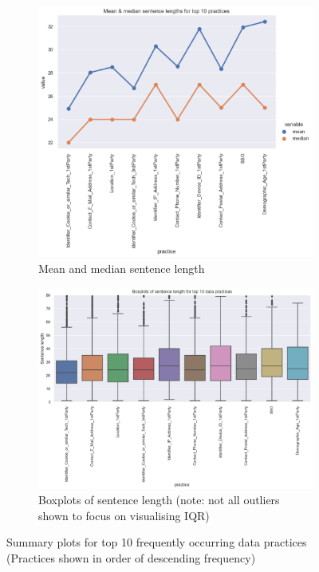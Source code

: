 \begin{figure}[!ht]
	\begin{subfigure}[b]{1\linewidth}
	  \centering
	  \includegraphics[width=0.85\linewidth]{figures/eda_mean_median.png}
	  \caption{Mean and median sentence length}
	\end{subfigure}
	\hfill
	\begin{subfigure}[b]{1\linewidth}
	  \centering
	  \includegraphics[width=0.85\linewidth]{figures/eda_boxplots.png}
	  \caption{Boxplots of sentence length (note: not all outliers shown to focus on visualising IQR)}
	\end{subfigure}
	\caption{Summary plots for top 10 frequently occurring data practices (Practices shown in order of descending frequency)}
	\label{fig:eda}
\end{figure}


